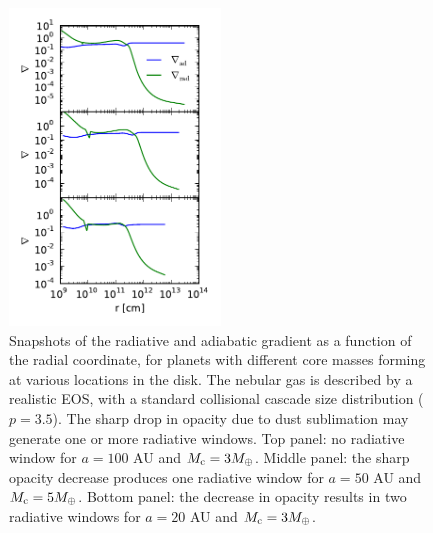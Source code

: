 \documentclass[apj]{emulateapj}
\newcommand{\co}{_{\rm c}}
\begin{document}
\begin{figure}[h!]
\centering
\includegraphics[width=0.5\textwidth]{../../figs/ModelAtmospheres/RadSelfGravRealEOS/PaperFigs/del_vs_r.pdf}
\caption{Snapshots of the radiative and adiabatic gradient as a function of the radial coordinate, for planets with different core masses forming at various locations in the disk. The nebular gas is described by a realistic EOS, with a standard collisional cascade size distribution ($p=3.5$). The sharp drop in opacity due to dust sublimation may generate one or more radiative windows. Top panel: no radiative window for $a=100$ AU and $M\co=3 M_{\oplus}$. Middle panel: the sharp opacity decrease produces one radiative window for $a=50$ AU and $M\co=5 M_{\oplus}$. Bottom panel: the decrease in opacity results in two radiative windows for $a=20$ AU and $M\co=3 M_{\oplus}$.}
\label{fig:delvsr}
\end{figure}


\end{document}
